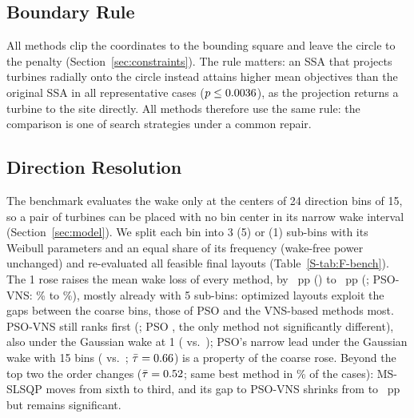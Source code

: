 \subsection{Boundary Rule}
\label{sec:boundary}
All methods clip the coordinates to the bounding square and leave the circle to the penalty (Section~\ref{sec:constraints}). The rule matters: an SSA that projects turbines radially onto the circle instead attains higher mean objectives than the original SSA in all \NBoundCases{} representative cases ($p\le0.0036$), as the projection returns a turbine to the site directly. All methods therefore use the same rule: the comparison is one of search strategies under a common repair.

\subsection{Direction Resolution}
\label{sec:direction}
The benchmark evaluates the wake only at the centers of 24 direction bins of 15\textdegree, so a pair of turbines can be placed with no bin center in its narrow wake interval (Section~\ref{sec:model}). We split each bin into 3 (5\textdegree) or \NFSubBins{} (1\textdegree) sub-bins with its Weibull parameters and an equal share of its frequency (wake-free power unchanged) and re-evaluated all \NFNLayouts{} feasible final layouts (Table~\ref{S-tab:F-bench}).
The 1\textdegree{} rose raises the mean wake loss of every method, by \NFLossRiseMin~pp (\NFLossRiseMinBy) to \NFLossRiseMax~pp (\NFLossRiseMaxBy; PSO-VNS: \NFLossPSOVNSFifteen\% to \NFLossPSOVNSOne\%), mostly already with 5\textdegree{} sub-bins: optimized layouts exploit the gaps between the coarse bins, those of PSO and the VNS-based methods most. PSO-VNS still ranks first (\NFRankPSOVNSOne; PSO \NFRankPSOOne, the only method not significantly different), also under the Gaussian wake at 1\textdegree{} (\NFGaussOneRankPSOVNS{} vs.\ \NFGaussOneRankPSO); PSO's narrow lead under the Gaussian wake with 15\textdegree{} bins (\NFGaussFifteenRankPSO{} vs.\ \NFGaussFifteenRankPSOVNS; $\bar\tau=0.66$) is a property of the coarse rose. Beyond the top two the order changes ($\bar\tau=0.52$; same best method in \NFSameBestOne\% of the cases): MS-SLSQP moves from sixth to third, and its gap to PSO-VNS shrinks from \NFSLSQPGapFifteen{} to \NFSLSQPGapOne~pp but remains significant.

